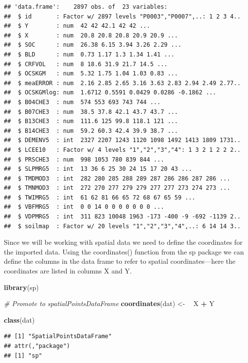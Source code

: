 \documentclass[10pt,b5paper,]{book}
\newenvironment{Shaded}{\begin{snugshade}}{\end{snugshade}}
\newcommand{\CommentTok}[1]{\textcolor[rgb]{0.56,0.35,0.01}{\textit{#1}}}
\newcommand{\ErrorTok}[1]{\textcolor[rgb]{0.64,0.00,0.00}{\textbf{#1}}}
\newcommand{\KeywordTok}[1]{\textcolor[rgb]{0.13,0.29,0.53}{\textbf{#1}}}
\newcommand{\NormalTok}[1]{#1}
\newcommand{\OperatorTok}[1]{\textcolor[rgb]{0.81,0.36,0.00}{\textbf{#1}}}
\newcommand{\StringTok}[1]{\textcolor[rgb]{0.31,0.60,0.02}{#1}}
\theoremstyle{definition}
\theoremstyle{definition}
\theoremstyle{definition}
\theoremstyle{remark}
\begin{document}
\begin{verbatim}
## 'data.frame':    2897 obs. of  23 variables:
##  $ id       : Factor w/ 2897 levels "P0003","P0007",..: 1 2 3 4..
##  $ Y        : num  42 42 42.1 42 42 ...
##  $ X        : num  20.8 20.8 20.8 20.9 20.9 ...
##  $ SOC      : num  26.38 6.15 3.94 3.26 2.29 ...
##  $ BLD      : num  0.73 1.17 1.3 1.34 1.41 ...
##  $ CRFVOL   : num  8 18.6 31.9 21.7 14.5 ...
##  $ OCSKGM   : num  5.32 1.75 1.04 1.03 0.83 ...
##  $ meaERROR : num  2.16 2.85 2.65 3.16 3.63 2.83 2.94 2.49 2.77..
##  $ OCSKGMlog: num  1.6712 0.5591 0.0429 0.0286 -0.1862 ...
##  $ B04CHE3  : num  574 553 693 743 744 ...
##  $ B07CHE3  : num  38.5 37.8 42.1 43.7 43.7 ...
##  $ B13CHE3  : num  111.6 125 99.8 118.1 121 ...
##  $ B14CHE3  : num  59.2 60.3 42.4 39.9 38.7 ...
##  $ DEMENV5  : int  2327 2207 1243 1120 1098 1492 1413 1809 1731..
##  $ LCEE10   : Factor w/ 4 levels "1","2","3","4": 1 3 2 1 2 2 2..
##  $ PRSCHE3  : num  998 1053 780 839 844 ...
##  $ SLPMRG5  : int  13 36 6 25 30 24 15 17 20 43 ...
##  $ TMDMOD3  : int  282 280 285 288 289 287 286 286 287 286 ...
##  $ TMNMOD3  : int  272 270 277 279 279 277 277 273 274 273 ...
##  $ TWIMRG5  : int  61 62 81 66 65 72 68 67 65 59 ...
##  $ VBFMRG5  : int  0 0 14 0 0 0 0 0 0 0 ...
##  $ VDPMRG5  : int  311 823 10048 1963 -173 -400 -9 -692 -1139 2..
##  $ soilmap  : Factor w/ 20 levels "1","2","3","4",..: 6 14 14 3..
\end{verbatim}

Since we will be working with spatial data we need to define the
coordinates for the imported data. Using the coordinates() function from
the sp package we can define the columns in the data frame to refer to
spatial coordinates---here the coordinates are listed in columns X and
Y.

\begin{Shaded}
\begin{Highlighting}[]
\KeywordTok{library}\NormalTok{(sp)}

\CommentTok{# Promote to spatialPointsDataFrame}
\KeywordTok{coordinates}\NormalTok{(dat) <-}\StringTok{ }\ErrorTok{~}\StringTok{ }\NormalTok{X }\OperatorTok{+}\StringTok{ }\NormalTok{Y}

\KeywordTok{class}\NormalTok{(dat)}
\end{Highlighting}
\end{Shaded}

\begin{verbatim}
## [1] "SpatialPointsDataFrame"
## attr(,"package")
## [1] "sp"
\end{verbatim}
\end{document}
